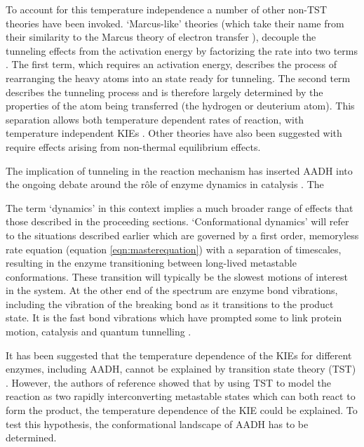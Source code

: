 To account for this temperature independence a number of other non-TST theories have been invoked. `Marcus-like' theories (which take their name from their similarity to the Marcus theory of electron transfer \cite{marcusElectronTransfersChemistry1985}),  decouple the tunneling effects from the activation energy by factorizing the rate into two terms \cite{antoniouLargeKineticIsotope1997, antoniouInternalEnzymeMotions2001, knappTemperatureDependentIsotopeEffects2002,knappEnvironmentallyCoupledHydrogen2002}. The first term, which requires an activation energy, describes the process of rearranging the heavy atoms into an state ready for tunneling. The second term describes the tunneling process and is therefore  largely determined by the properties of the atom being transferred (the hydrogen or deuterium atom). This separation allows both temperature dependent rates of reaction, with temperature independent KIEs \cite{klinmanHydrogenTunnelingLinks2013, knappEnvironmentallyCoupledHydrogen2002}. Other theories have also been suggested with require effects arising from non-thermal equilibrium effects.  


The implication of tunneling in the reaction mechanism has inserted AADH into the ongoing debate around the r\^ole of enzyme dynamics in catalysis \cite{klinmanHydrogenTunnelingLinks2013, puMultidimensionalTunnelingRecrossing2006, mcgeaghProteinDynamicsEnzyme2011,glowackiTakingOckhamRazor2012b,glowackiProteinDynamicsEnzyme2012}. The 




The term `dynamics' in this context implies a much broader range of effects that those described in the proceeding sections. `Conformational dynamics' will refer to the situations described earlier which are governed by a first order, memoryless rate equation (equation \ref{eqn:masterequation}) with a separation of timescales, resulting in the enzyme transitioning between long-lived metastable conformations. These transition will typically be the slowest motions of interest in the system. At the other end of the spectrum are enzyme bond vibrations, including the vibration of the breaking bond as it transitions to the product state. It is the fast bond vibrations which have prompted some to link protein motion, catalysis and quantum tunnelling \cite{klinmanHydrogenTunnelingLinks2013, puMultidimensionalTunnelingRecrossing2006, antoniouInternalEnzymeMotions2001}.  





It has been suggested that the temperature dependence of the KIEs for different enzymes, including AADH, cannot be explained by transition state theory (TST) \cite{agrawalVibrationallyEnhancedHydrogen2004,kohenEnzymeCatalysisClassical1998}. However, the authors of reference \cite{glowackiProteinDynamicsEnzyme2012a} showed that by using TST to model the reaction as two rapidly interconverting metastable states which can both react to form the product, the temperature dependence of the KIE could be explained. To test this hypothesis, the conformational landscape of AADH has to be determined. 

